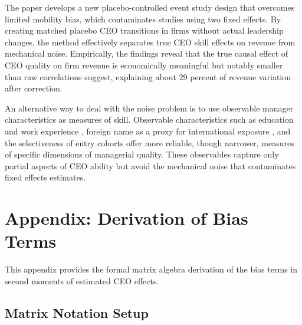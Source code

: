 \documentclass[11pt,a4paper]{article}
\begin{document}
The paper develops a new placebo-controlled event study design that overcomes limited mobility bias, which contaminates studies using two fixed effects.  By creating matched placebo CEO transitions in firms without actual leadership changes, the method effectively separates true CEO skill effects on revenue from mechanical noise. Empirically, the findings reveal that the true causal effect of CEO quality on firm revenue is economically meaningful but notably smaller than raw correlations suggest, explaining about 29 percent of revenue variation after correction. 

An alternative way to deal with the noise problem is to use observable manager characteristics as measures of skill. Observable characteristics such as education and work experience \citep{DePirro2025}, foreign name as a proxy for international exposure \citep{Koren2023expat}, and the selectiveness of entry cohorts \citep{koren2024managers} offer more reliable, though narrower, measures of specific dimensions of managerial quality. These observables capture only partial aspects of CEO ability but avoid the mechanical noise that contaminates fixed effects estimates.

\clearpage
\appendix
\renewcommand{\thefigure}{A\arabic{figure}}
\renewcommand{\thetable}{A\arabic{table}}
\setcounter{figure}{0}
\setcounter{table}{0}


\section{Appendix: Derivation of Bias Terms}
This appendix provides the formal matrix algebra derivation of the bias terms in second moments of estimated CEO effects.

\subsection{Matrix Notation Setup}
\end{document}
